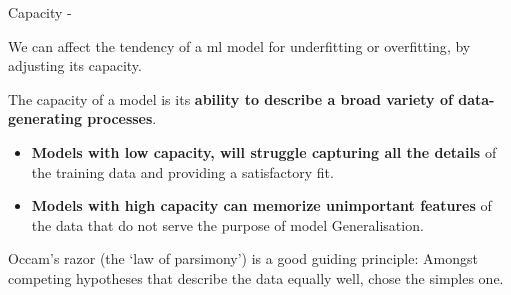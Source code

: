 
\begin{frame}[t,allowframebreaks]{Capacity -}

    We can affect the tendency of a \gls{ml} model for 
    \gls{underfitting} or 
    \gls{overfitting},
    by adjusting its 
    \gls{capacity}.\\

    \vspace{0.2cm}

    The \gls{capacity} of a model is its 
    {\bf ability to describe a broad variety of data-generating processes}.

    \vspace{0.2cm}

    \begin{itemize}
        \item 
        {\bf Models with low capacity, 
        will struggle capturing all the details} 
        of the training data and providing a satisfactory fit.\\
        \item 
        {\bf Models with high capacity 
        can memorize unimportant features} of the data
        that do not serve the purpose of model Generalisation.
    \end{itemize}

    \vspace{0.2cm}

    Occam's razor (the `law of parsimony')
    \cite{Wikipedia:OccamRazor} is a good guiding principle:
    Amongst competing hypotheses that describe the data equally well,
    chose the simples one.\\

    \vspace{0.2cm}


\end{frame}
